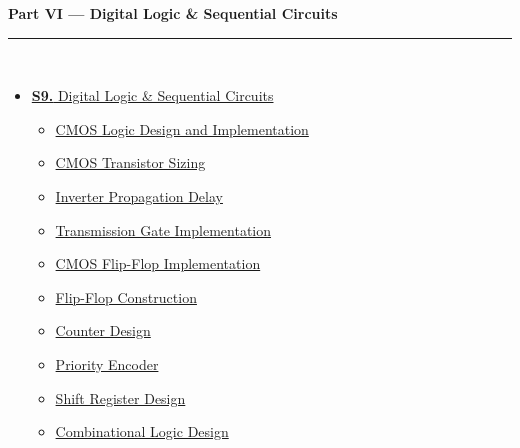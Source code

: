 \documentclass[12pt,a4paper]{article}
\begin{document}
\begin{tcolorbox}[breakable,colback=cD!5,colframe=cD,boxrule=1pt,arc=5pt,
  left=8pt,right=8pt,top=8pt,bottom=8pt,before skip=4pt]
  {\large\bfseries\textcolor{cD}{Part VI --- Digital Logic \& Sequential Circuits}}\\[5pt]
  \textcolor{cD!40}{\rule{\textwidth}{0.4pt}}\\[3pt]
  \small\begin{itemize}[leftmargin=1.2em,itemsep=1pt,label={\textcolor{cD}{$\triangleright$}}]
    \item \hyperref[sec:S9]{\textbf{S9.} Digital Logic \& Sequential Circuits}
      \begin{itemize}[leftmargin=1.5em,itemsep=0pt,label={\textcolor{cD}{$\cdot$}}]
        \item \hyperref[sub:s9-cmos]{CMOS Logic Design and Implementation}
        \item \hyperref[sub:s9-sizing]{CMOS Transistor Sizing}
        \item \hyperref[sub:s9-delay]{Inverter Propagation Delay}
        \item \hyperref[sub:s9-tg]{Transmission Gate Implementation}
        \item \hyperref[sub:s9-ff-cmos]{CMOS Flip-Flop Implementation}
        \item \hyperref[sub:s9-ff-construction]{Flip-Flop Construction}
        \item \hyperref[sub:s9-counter]{Counter Design}
        \item \hyperref[sub:s9-encoder]{Priority Encoder}
        \item \hyperref[sub:s9-shift]{Shift Register Design}
        \item \hyperref[sub:s9-combo]{Combinational Logic Design}
      \end{itemize}
  \end{itemize}
\end{tcolorbox}

\vspace{6pt}
\end{document}
